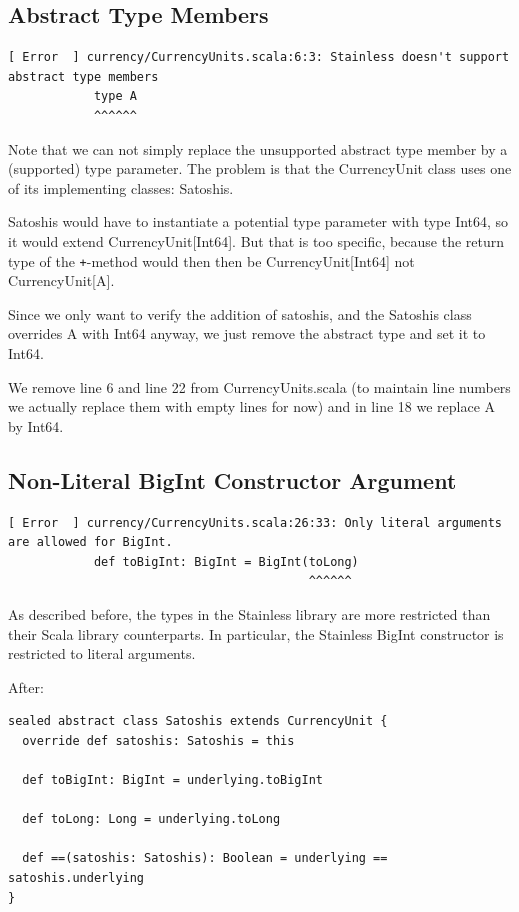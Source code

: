 \documentclass[runningheads]{llncs}
\begin{document}
\subsection{Abstract Type Members}


\begin{lstlisting}[style=stainless]
[ Error  ] currency/CurrencyUnits.scala:6:3: Stainless doesn't support abstract type members
            type A
            ^^^^^^
\end{lstlisting}

Note that we can not simply replace the unsupported abstract type
member by a (supported) type parameter. The problem is that the
CurrencyUnit class uses one of its implementing classes: Satoshis.

Satoshis would have to instantiate a potential type parameter with
type Int64, so it would extend CurrencyUnit[Int64]. But that is too
specific, because the return type of the \texttt{+}-method would then then be
CurrencyUnit[Int64] not CurrencyUnit[A].

Since we only want to verify the addition of satoshis, and the
Satoshis class overrides A with Int64 anyway, we just remove the
abstract type and set it to Int64.

We remove line 6 and line 22 from CurrencyUnits.scala (to maintain
line numbers we actually replace them with empty lines for now) and in
line 18 we replace A by Int64.


\subsection{Non-Literal BigInt Constructor Argument}


\begin{lstlisting}[style=stainless]
[ Error  ] currency/CurrencyUnits.scala:26:33: Only literal arguments are allowed for BigInt.
            def toBigInt: BigInt = BigInt(toLong)
                                          ^^^^^^
\end{lstlisting}

As described before, the types in the Stainless library are more
restricted than their Scala library counterparts. In particular, the
Stainless BigInt constructor is restricted to literal arguments.


After:
\begin{lstlisting}[style=scala]
sealed abstract class Satoshis extends CurrencyUnit {
  override def satoshis: Satoshis = this

  def toBigInt: BigInt = underlying.toBigInt

  def toLong: Long = underlying.toLong

  def ==(satoshis: Satoshis): Boolean = underlying == satoshis.underlying
}
\end{lstlisting}
\end{document}
